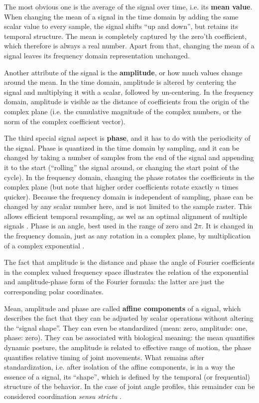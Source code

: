 \documentclass[10pt,a4paper]{article}
\begin{document}
The most obvious one is the average of the signal over time, i.e. its \textbf{mean value}.
When changing the mean of a signal in the time domain by adding the same scalar value to every sample, the signal shifts ``up and down'', but retains its temporal structure.
The mean is completely captured by the zero'th coefficient, which therefore is always a real number.
Apart from that, changing the mean of a signal leaves its frequency domain representation unchanged.

Another attribute of the signal is the \textbf{amplitude}, or how much values change around the mean.
In the time domain, amplitude is altered by centering the signal and multiplying it with a scalar, followed by un-centering.
In the frequency domain, amplitude is visible as the distance of coefficients from the origin of the complex plane (i.e. the cumulative magnitude of the complex numbers, or the norm of the complex coefficient vector).

The third special signal aspect is \textbf{phase}, and it has to do with the periodicity of the signal.
Phase is quantized in the time domain by sampling, and it can be changed by taking a number of samples from the end of the signal and appending it to the start (``rolling'' the signal around, or changing the start point of the cycle).
In the frequency domain, changing the phase rotates the coefficients in the complex plane (but note that higher order coefficients rotate exactly \(n\) times quicker).
Because the frequency domain is independent of sampling, phase can be changed by any scalar number here, and is not limited to the sample raster.
This allows efficient temporal resampling, as wel as an optimal alignment of multiple signals \citep[\textit{cf.} supplementary information of][]{Mielke2019}.
Phase is an angle, best used in the range of zero and \(2\pi\).
It is changed in the frequency domain, just as any rotation in a complex plane, by multiplication of a complex exponential \citep["delay/shift theorem", \textit{cf.}][]{Bracewell2000}.

The fact that amplitude is the distance and phase the angle of Fourier coefficients in the complex valued frequency space illustrates the relation of the exponential and amplitude-phase form of the Fourier formula: the latter are just the corresponding polar coordinates.


Mean, amplitude and phase are called \textbf{affine components} of a signal, which describes the fact that they can be adjusted by scalar operations without altering the ``signal shape''.
They can even be standardized (mean: zero, amplitude: one, phase: zero).
They can be associated with biological meaning: the mean quantifies dynamic posture, the amplitude is related to effective range of motion, the phase quantifies relative timing of joint movements.
What remains after standardization, i.e. after isolation of the affine components, is in a way the essence of a signal, its ``shape'', which is defined by the temporal (or frequential) structure of the behavior.
In the case of joint angle profiles, this remainder can be considered coordination \emph{sensu strictu} \citep{Mielke2019,Mielke2022}.
\end{document}

